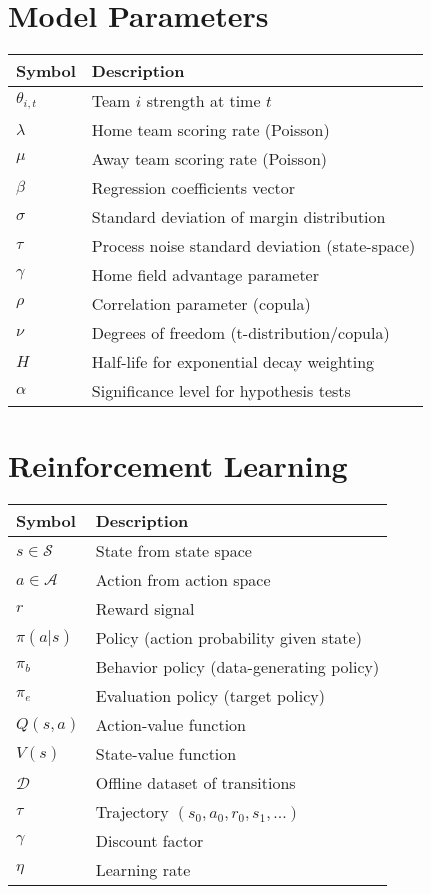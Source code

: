 \section*{Model Parameters}

\begin{tabular}{ll}
\toprule
\textbf{Symbol}  & \textbf{Description} \\
\midrule
$\theta_{i,t}$ & Team $i$ strength at time $t$ \\
$\lambda$ & Home team scoring rate (Poisson) \\
$\mu$ & Away team scoring rate (Poisson) \\
$\beta$ & Regression coefficients vector \\
$\sigma$ & Standard deviation of margin distribution \\
$\tau$ & Process noise standard deviation (state-space) \\
$\gamma$ & Home field advantage parameter \\
$\rho$ & Correlation parameter (copula) \\
$\nu$ & Degrees of freedom (t-distribution/copula) \\
$H$ & Half-life for exponential decay weighting \\
$\alpha$ & Significance level for hypothesis tests \\
\bottomrule
\end{tabular}

\section*{Reinforcement Learning}

\begin{tabular}{ll}
\toprule
\textbf{Symbol}  & \textbf{Description} \\
\midrule
$s \in \mathcal{S}$ & State from state space \\
$a \in \mathcal{A}$ & Action from action space \\
$r$ & Reward signal \\
$\pi(a|s)$ & Policy (action probability given state) \\
$\pi_b$ & Behavior policy (data-generating policy) \\
$\pi_e$ & Evaluation policy (target policy) \\
$Q(s,a)$ & Action-value function \\
$V(s)$ & State-value function \\
$\mathcal{D}$ & Offline dataset of transitions \\
$\tau$ & Trajectory $(s_0, a_0, r_0, s_1, ...)$ \\
$\gamma$ & Discount factor \\
$\eta$ & Learning rate \\
\bottomrule
\end{tabular}

